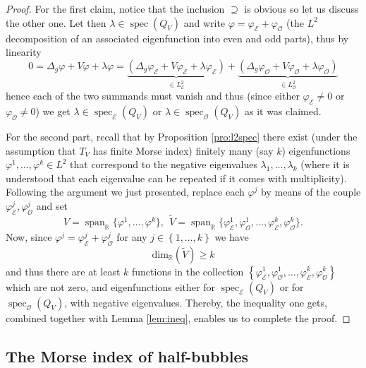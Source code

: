 \documentclass[JEP,XML,SOM,Unicode]{cedram}
\let\mathcal\mathscr
\DeclareMathOperator{\Span}{span}
\DeclareMathOperator{\spec}{spec}
\theoremstyle{definition}
\newcommand{\R}{\mathbb{R}}
\begin{document}
\begin{proof}
For the first claim, notice that the inclusion $\supseteq$ is obvious so let us discuss the other one. Let then $\lambda \in \spec(Q_V)$ and write $\varphi=\varphi_{\mathcal{E}}+\varphi_{\mathcal{O}}$ (the $L^2$ decomposition of an associated eigenfunction into even and odd parts), thus by linearity
\[
0=\Delta_g \varphi+V\varphi+\lambda\varphi= \underbrace{(\Delta_g \varphi_{\mathcal{E}}+V\varphi_{\mathcal{E}}+\lambda\varphi_{\mathcal{E}})}_{\in L^2_{\mathcal{E}} } + \underbrace{(\Delta_g \varphi_{\mathcal{O}}+V\varphi_{\mathcal{O}}+\lambda\varphi_{\mathcal{O}})}_{\in L^2_{\mathcal{O}}}
\]
hence each of the two summands must vanish and thus (since either $\varphi_{\mathcal{E}}\neq 0$ or $\varphi_{\mathcal{O}}\neq 0$) we get $\lambda\in \spec_{\mathcal{E}} (Q_V)$ or $\lambda\in \spec_{\mathcal{O}} (Q_V)$ as it was claimed.

For the second part, recall that by Proposition \ref{pro:l2spec} there exist (under the assumption that $T_V$ has finite Morse index) finitely many (say $k$) eigenfunctions $\varphi^1,\ldots,\varphi^k \in L^2$ that correspond to the negative eigenvalues $\lambda_1,\ldots,\lambda_k$ (where it is understood that each eigenvalue can be repeated if it comes with multiplicity).
Following the argument we just presented, replace each $\varphi^j$ by means of the couple $\varphi^j_{\mathcal{E}}, \varphi^j_{\mathcal{O}}$ and set
\[
V=\Span_{\R}\bigl\{\varphi^1,\ldots,\varphi^k \bigr\}, \ \ \widetilde{V}=\Span_{\R} \bigl\{\varphi^1_{\mathcal{E}}, \varphi^1_{\mathcal{O}},\ldots, \varphi^k_{\mathcal{E}}, \varphi^k_{\mathcal{O}} \bigr\}.
\]
Now, since $\varphi^j=\varphi^j_{\mathcal{E}}+\varphi^j_{\mathcal{O}}$ for any $j\in\left\{1,\ldots, k\right\}$ we have
\[
\text{dim}_{\R}(\widetilde{V})\geq k
\]
and thus there are at least $k$ functions in the collection $\left\{\varphi^1_{\mathcal{E}}, \varphi^1_{\mathcal{O}},\ldots, \varphi^k_{\mathcal{E}}, \varphi^k_{\mathcal{O}} \right\}$ which are not zero, and eigenfunctions either for $\spec_{\mathcal{E}} (Q_V)$ or for $\spec_{\mathcal{O}} (Q_V)$, with negative eigenvalues. Thereby, the inequality one gets, combined together with Lemma \ref{lem:ineq}, enables us to complete the proof.
\end{proof}

\subsection{The Morse index of half-bubbles}\label{subs:morsehalf}
\end{document}
